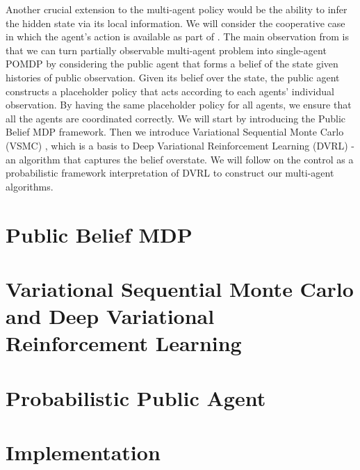 \label{chapter:chap5}
\begin{miniabstract}
Another crucial extension to the multi-agent policy would be the ability to infer the hidden state via its local information. We will consider the cooperative case in which the agent's action is available as part of . The main observation from \cite{nayyar2013decentralized, foerster2018bayesian} is that we can turn partially observable multi-agent problem into single-agent POMDP by considering the public agent that forms a belief of the state given histories of public observation. Given its belief over the state, the public agent constructs a placeholder policy that acts according to each agents' individual observation. By having the same placeholder policy for all agents, we ensure that all the agents are coordinated correctly. We will start by introducing the Public Belief MDP framework. Then we introduce Variational Sequential Monte Carlo (VSMC) \cite{le2017auto, maddison2017filtering, naesseth2017variational}, which is a basis to Deep Variational Reinforcement Learning (DVRL) \cite{igl2018deep} - an algorithm that captures the belief overstate. We will follow \cite{shvechikovjoint} on the control as a probabilistic framework interpretation of DVRL to construct our multi-agent algorithms.
\end{miniabstract}

\section{Public Belief MDP}


\section{Variational Sequential Monte Carlo and Deep Variational Reinforcement Learning}


\section{Probabilistic Public Agent}


\section{Implementation}

